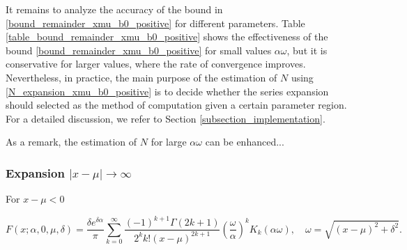 \documentclass[10pt,a4paper,oneside]{article}
\numberwithin{equation}{section}
\begin{document}
It remains to analyze the accuracy of the bound in \eqref{bound_remainder_xmu_b0_positive} for different parameters. Table \ref{table_bound_remainder_xmu_b0_positive} shows the effectiveness of the bound \eqref{bound_remainder_xmu_b0_positive} for small values $\alpha\omega$, but it is conservative for larger values, where the rate of convergence improves. Nevertheless, in practice, the main purpose of the estimation of $N$ using \eqref{N_expansion_xmu_b0_positive} is to decide whether the series expansion should selected as the method of computation given a certain parameter region. For a detailed discussion, we refer to Section \ref{subsection_implementation}.
\begin{table}[H]
	\centering
	\caption{Absolute error and bound \eqref{bound_remainder_xmu_b0_positive} estimating $N$ using \eqref{N_expansion_xmu_b0_positive} for the series expansion  \eqref{expansion_xmu_b0_positive}.}
	\label{table_bound_remainder_xmu_b0_positive}
\end{table}

As a remark, the estimation of $N$ for large $\alpha\omega$ can be enhanced...

\subsubsection{Expansion $|x-\mu| \to \infty$}
For $x - \mu < 0$

\begin{equation}
F(x; \alpha, 0, \mu, \delta) = \frac{\delta e^{\delta \alpha}}{\pi} \sum_{k=0}^{\infty}\frac{(-1)^{k+1}\Gamma(2k + 1)}{2^k k! (x-\mu)^{2k + 1}} \left(\frac{\omega}{\alpha}\right)^k K_k(\alpha \omega), \quad \omega = \sqrt{(x-\mu)^2 + \delta^2}.
\end{equation}
\end{document}

